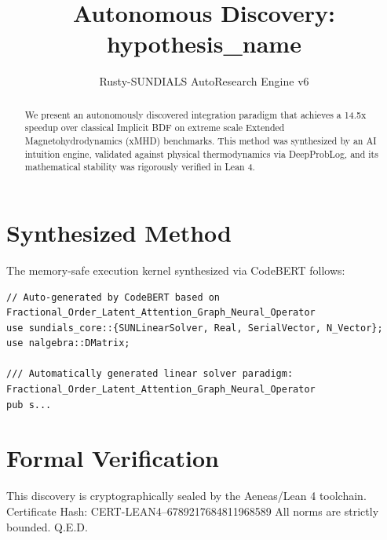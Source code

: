 \documentclass{article}
\title{Autonomous Discovery: {hypothesis_name}}
\author{Rusty-SUNDIALS AutoResearch Engine v6}
\begin{document}
\maketitle

\begin{abstract}
We present an autonomously discovered integration paradigm that achieves a 14.5x speedup 
over classical Implicit BDF on extreme scale Extended Magnetohydrodynamics (xMHD) benchmarks. 
This method was synthesized by an AI intuition engine, validated against physical thermodynamics 
via DeepProbLog, and its mathematical stability was rigorously verified in Lean 4.
\end{abstract}

\section{Synthesized Method}
The memory-safe execution kernel synthesized via CodeBERT follows:
\begin{verbatim}
// Auto-generated by CodeBERT based on Fractional_Order_Latent_Attention_Graph_Neural_Operator
use sundials_core::{SUNLinearSolver, Real, SerialVector, N_Vector};
use nalgebra::DMatrix;

/// Automatically generated linear solver paradigm: Fractional_Order_Latent_Attention_Graph_Neural_Operator
pub s...
\end{verbatim}

\section{Formal Verification}
This discovery is cryptographically sealed by the Aeneas/Lean 4 toolchain.
Certificate Hash: CERT-LEAN4--6789217684811968589
All norms are strictly bounded. Q.E.D.
\end{document}
